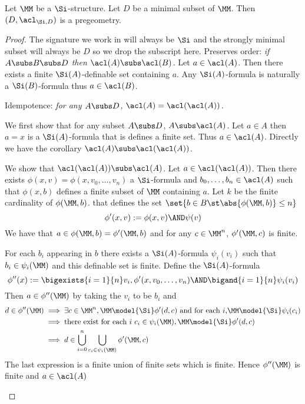 \begin{prop}
    Let $\MM$ be a $\Si$-structure. 
    Let $D$ be a minimal subset of $\MM$.
    Then $(D,\acl_{\Si,D})$ is a pregeometry.
\end{prop}
\begin{proof}\cite{fandom0}
    The signature we work in will always be $\Si$ and the 
    strongly minimal subset will always be $D$ so we drop the subscript here.
    Preserves order: 
    \emph{if $A \subs B \subs D$ then $\acl(A) \subs \acl(B)$.}
    Let $a \in \acl(A)$. 
    Then there exists a finite $\Si(A)$-definable set containing $a$.
    Any $\Si(A)$-formula is naturally a $\Si(B)$-formula thus $a \in \acl(B)$.

    Idempotence: \emph{for any $A \subs D$, $\acl(A) = \acl(\acl(A))$.}
    \begin{forward}
        We first show that for any subset $A \subs D$, $A \subs \acl(A)$.
        Let $a \in A$ then $a = x$ is a $\Si(A)$-formula that is defines a 
        finite set. 
        Thus $a \in \acl(A)$.
        Directly we have the corollary $\acl(A) \subs \acl(\acl(A))$.
    \end{forward}

    \begin{backward}
        We show that $\acl(\acl(A)) \subs \acl(A)$.
        Let $a \in \acl(\acl(A))$.
        Then there exists $\phi(x,v) = \phi(x,v_0,\dots,v_n)$ a $\Si$-formula 
        and $b_0,\dots, b_n \in \acl(A)$ such that $\phi(x,b)$
        defines a finite subset of $\MM$ containing $a$.
        Let $k$ be the finite cardinality of $\phi(\MM,b)$.
        that defines the set 
        $\set{b \in B \st \abs{\phi(\MM,b)} \leq n}$
        \[
            \phi'(x,v) := \phi(x,v) \AND \psi(v)
        \]
        We have that $a \in \phi(\MM,b) = \phi'(\MM,b)$
        and for any $c \in \MM^n$, $\phi'(\MM,c)$ is finite.
    
        For each $b_i$ appearing in $b$
        there exists a $\Si(A)$-formula $\psi_i(v_i)$ such that 
        $b_i \in \psi_i(\MM)$ and this definable set is finite.
        Define the $\Si(A)$-formula
        \[
            \phi''(x) := \bigexists{i = 1}{n} v_i,
            \phi'(x,v_0,\dots,v_n) \AND \bigand{i = 1}{n} \psi_i(v_i)
        \]
        Then $a \in \phi''(\MM)$ by taking the $v_i$ to be $b_i$ and 
        \begin{align*}
            d \in \phi''(\MM) 
            &\implies \exists c \in \MM^n, \MM \model{\Si}\phi'(d,c) 
            \text{ and for each $i$,} \MM \model{\Si}\psi_i(c_i)\\
            &\implies \text{there exist for each $i$ } c_i \in \psi_i(\MM),
            \MM \model{\Si}\phi'(d,c) \\
            &\implies d \in 
            \bigcup_{i = 0}^n \bigcup_{c_i \in \psi_i(\MM)} \phi'(\MM,c)
        \end{align*}
        The last expression is a finite union of finite sets which is finite.
        Hence $\phi''(\MM)$ is finite and $a \in \acl(A)$
    \end{backward}
    

\end{proof}
